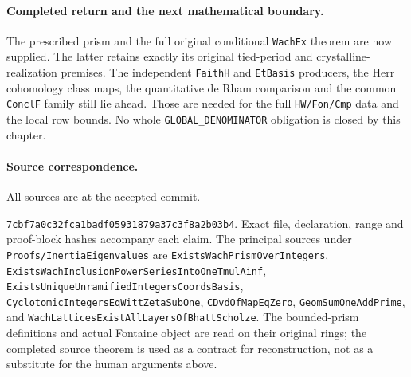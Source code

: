 \documentclass[11pt,a4paper]{article}
\numberwithin{equation}{section}
\theoremstyle{remark}\newtheorem{remark}[theorem]{Remark}
\begin{document}
\paragraph{Completed return and the next mathematical boundary.}
The prescribed prism and the full original conditional
\texttt{Wach\allowbreak Ex} theorem are now supplied. The latter retains
exactly its original tied-period and crystalline-realization
premises. The independent \texttt{Faith\allowbreak H} and \texttt{Et\allowbreak Basis}
producers, the Herr cohomology class maps, the quantitative
de Rham comparison and the common \texttt{Concl\allowbreak F} family still
lie ahead. Those are needed for the full \texttt{HW/\allowbreak Fon/\allowbreak Cmp}
data and the local row bounds. No whole
\texttt{GLOBAL\_\allowbreak DENOMINATOR} obligation is closed
by this chapter.

\paragraph{Source correspondence.}
All sources are at the accepted commit.
\par\noindent\texttt{7cbf7a0c32fca1badf05931879a37c3f8a2b03b4}.
Exact file, declaration, range and proof-block hashes accompany
each claim. The principal sources under
\texttt{Proofs/\allowbreak Inertia\allowbreak Eigenvalues} are
\texttt{Exists\allowbreak Wach\allowbreak Prism\allowbreak Over\allowbreak Integers},
\texttt{Exists\allowbreak Wach\allowbreak Inclusion\allowbreak Power\allowbreak Series\allowbreak Into\allowbreak One\allowbreak Tmul\allowbreak Ainf},
\texttt{Exists\allowbreak Unique\allowbreak Unramified\allowbreak Integers\allowbreak Coords\allowbreak Basis},
\texttt{Cyclotomic\allowbreak Integers\allowbreak Eq\allowbreak Witt\allowbreak Zeta\allowbreak Sub\allowbreak One},
\texttt{CDvd\allowbreak Of\allowbreak Map\allowbreak Eq\allowbreak Zero},
\texttt{Geom\allowbreak Sum\allowbreak One\allowbreak Add\allowbreak Prime},
and \texttt{Wach\allowbreak Lattices\allowbreak Exist\allowbreak All\allowbreak Layers\allowbreak Of\allowbreak Bhatt\allowbreak Scholze}.
The bounded-prism definitions and actual Fontaine object are
read on their original rings; the completed source theorem is
used as a contract for reconstruction, not as a substitute for
the human arguments above.

\endgroup
\end{document}
